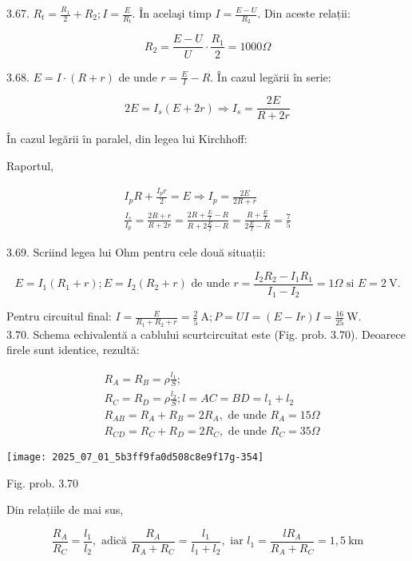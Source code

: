 3.67. $R_{t}=\frac{R_{1}}{2}+R_{2} ; I=\frac{E}{R_{t}}$. În acelaşi timp $I=\frac{E-U}{R_{2}}$. Din aceste relații:

$$
R_{2}=\frac{E-U}{U} \cdot \frac{R_{1}}{2}=1000 \Omega
$$

3.68. $E=I \cdot(R+r)$ de unde $r=\frac{E}{I}-R$. În cazul legării în serie:

$$
2 E=I_{s}(E+2 r) \Rightarrow I_{s}=\frac{2 E}{R+2 r}
$$

În cazul legării în paralel, din legea lui Kirchhoff:

Raportul,

$$
\begin{gathered}
I_{p} R+\frac{I_{p} r}{2}=E \Rightarrow I_{p}=\frac{2 E}{2 R+r} \\
\frac{I_{s}}{I_{p}}=\frac{2 R+r}{R+2 r}=\frac{2 R+\frac{E}{I}-R}{R+2 \frac{E}{I}-R}=\frac{R+\frac{E}{I}}{2 \frac{E}{I}-R}=\frac{7}{5}
\end{gathered}
$$

3.69. Scriind legea lui Ohm pentru cele două situații:

$$
E=I_{1}\left(R_{1}+r\right) ; E=I_{2}\left(R_{2}+r\right) \text { de unde } r=\frac{I_{2} R_{2}-I_{1} R_{1}}{I_{1}-I_{2}}=1 \Omega \text { si } E=2 \mathrm{~V} .
$$

Pentru circuitul final: $I=\frac{E}{R_{1}+R_{2}+r}=\frac{2}{5} \mathrm{~A} ; P=U I=(E-I r) I=\frac{16}{25} \mathrm{~W}$.\\
3.70. Schema echivalentă a cablului scurtcircuitat este (Fig. prob. 3.70). Deoarece firele sunt identice, rezultă:

$$
\begin{aligned}
& R_{A}=R_{B}=\rho \frac{l_{1}}{S} ; \\
& R_{C}=R_{D}=\rho \frac{l_{2}}{S} ; l=A C=B D=l_{1}+l_{2} \\
& R_{A B}=R_{A}+R_{B}=2 R_{A}, \text { de unde } R_{A}=15 \Omega \\
& R_{C D}=R_{C}+R_{D}=2 R_{C}, \text { de unde } R_{C}=35 \Omega
\end{aligned}
$$

\begin{center}
\texttt{[image: 2025\_07\_01\_5b3ff9fa0d508c8e9f17g-354]}
\end{center}

Fig. prob. 3.70

Din relațiile de mai sus,

$$
\frac{R_{A}}{R_{C}}=\frac{l_{1}}{l_{2}}, \text { adică } \frac{R_{A}}{R_{A}+R_{C}}=\frac{l_{1}}{l_{1}+l_{2}}, \text { iar } l_{1}=\frac{l R_{A}}{R_{A}+R_{C}}=1,5 \mathrm{~km}
$$

